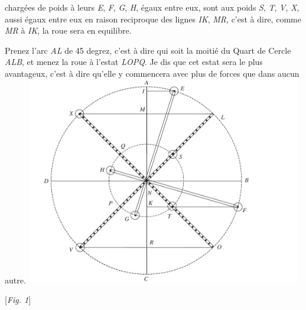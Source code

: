 charg\'{e}es de poids \`{a} leurs
\textit{E}, \textit{F}, \textit{G}, \textit{H}, \'{e}gaux entre eux, sont aux poids \textit{S}, \textit{T}, \textit{V}, \textit{X},
aussi \'{e}gaux entre eux en raison reciproque des lignes \textit{IK}, \textit{MR}, c'est \`{a} dire, comme \textit{MR} \`{a} \textit{IK},
la roue sera en equilibre\protect{}.
\pend
\pstart \vspace{0.8em}
 \begin{center}  \end{center} \pend 
\pstart 
\noindent {} \pend 
\pstart  Prenez l'arc \textit{AL} de 45 degrez, c'est \`{a} dire qui  soit la moiti\'{e} du Quart de Cercle \textit{ALB}, et menez la  roue \`{a} l'estat \textit{LOPQ}. Je dis que cet estat  sera le plus avantageux, c'est \`{a} dire qu'elle y commencera  avec plus de forces que dans aucun autre. \pend 
\pstart
\centering
 \hspace{0mm} \includegraphics[width=0.9\textwidth]{images/25rx1a.pdf}
\begin{center} [\textit{Fig. 1}]
 \end{center}
\pend
\vspace{1.5em}
